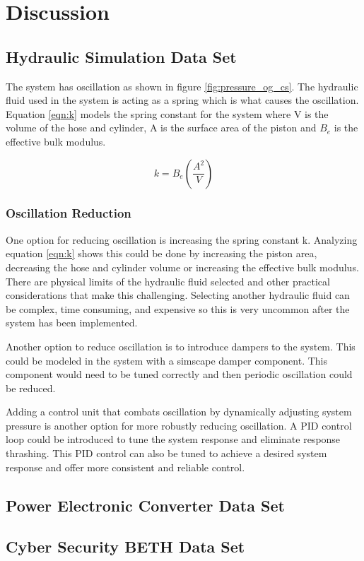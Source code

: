 \section{Discussion}
\label{sec:conclusion}

\subsection{Hydraulic Simulation Data Set}
The system has oscillation as shown in figure \ref{fig:pressure_og_cs}. The hydraulic fluid used in the system is acting as a spring which is what causes the oscillation. Equation \ref{eqn:k} models the spring constant for the system where V is the volume of the hose and cylinder, A is the surface area of the piston and $B_e$ is the effective bulk modulus. 

\begin{equation}
    k = B_e \left ( \frac{A^2}{V} \right)
    \label{eqn:k}
\end{equation}

\subsubsection{Oscillation Reduction}

One option for reducing oscillation is increasing the spring constant k. Analyzing equation \ref{eqn:k} shows this could be done by increasing the piston area, decreasing the hose and cylinder volume or increasing the effective bulk modulus. There are physical limits of the hydraulic fluid selected and other practical considerations that make this challenging. Selecting another hydraulic fluid can be complex, time consuming, and expensive so this is very uncommon after the system has been implemented. 

Another option to reduce oscillation is to introduce dampers to the system. This could be modeled in the system with a simscape damper component. This component would need to be tuned correctly and then periodic oscillation could be reduced.

Adding a control unit that combats oscillation by dynamically adjusting system pressure is another option for more robustly reducing oscillation. A PID control loop could be introduced to tune the system response and eliminate response thrashing. This PID control can also be tuned to achieve a desired system response and offer more consistent and reliable control.

\subsection{Power Electronic Converter Data Set}

\subsection{Cyber Security BETH Data Set}
